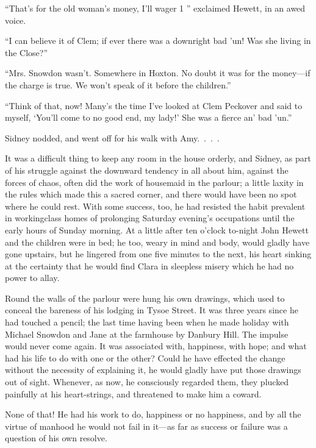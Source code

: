 ``That's for the old woman's money, I'll wager 1 '' exclaimed Hewett, in
an awed voice.

``I can believe it of Clem; if ever there was a downright bad 'un! Was
she living in the Close?''

``Mrs. Snowdon wasn't. Somewhere in Hoxton. No doubt it was for the
money---if the charge is true. We won't speak of it before the
children.''

``Think of that, now! Many's the time I've looked at Clem Peckover and
said to myself, {}`You'll come to no good end, my lady!' She was a
fierce an' bad 'un.''

Sidney nodded, and went off for his walk with Amy{.~.~.~.}

It was a difficult thing to keep any room in the house orderly, and
Sidney, as part of his struggle against the downward tendency in all
about him, against the forces of chaos, often did the work of housemaid
in the parlour; a little laxity in the rules which made this a sacred
corner, and there would have been no spot where he could rest. With some
success, too, he had resisted the habit prevalent in workingclass homes
of prolonging Saturday evening's occupations until the early hours of
Sunday morning. At a little after ten o'clock to-night John Hewett and
the children were in bed; he too, weary in mind and body, would gladly
have gone upstairs, but he lingered from one five minutes to the next,
his heart sinking at the certainty that he would find Clara in sleepless
misery which he had no power to allay.

Round the walls of the parlour were hung his own drawings, which used to
conceal the bareness of his lodging in Tysoe Street. It was {}three
years since he had touched a pencil; the last time having been when he
made holiday with Michael Snowdon and Jane at the farmhouse by Danbury
Hill. The impulse would never come again. It was associated with,
happiness, with hope; and what had his life to do with one or the other?
Could he have effected the change without the necessity of explaining
it, he would gladly have put those drawings out of sight. Whenever, as
now, he consciously regarded them, they plucked painfully at his
heart-strings, and threatened to make him a coward.

None of that! He had his work to do, happiness or no happiness, and by
all the virtue of manhood he would not fail in it---as far as success or
failure was a question of his own resolve.

